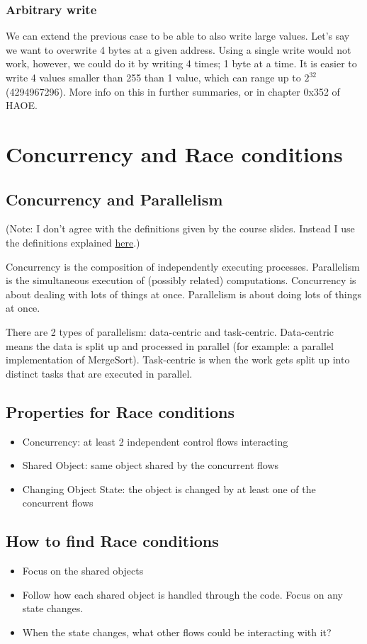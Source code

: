 \documentclass[letterpaper]{article}
\newcommand{\p}{\vspace{1em}\par}		%
\begin{document}
\subsubsection{Arbitrary write}
We can extend the previous case to be able to also write large values. Let's say we want to overwrite 4 bytes at a given address. Using a single write would not work, however, we could do it by writing 4 times; 1 byte at a time. It is easier to write 4 values smaller than 255 than 1 value, which can range up to $2^{32}$ (4294967296). More info on this in further summaries, or in chapter 0x352 of HAOE.

\section{Concurrency and Race conditions}
\subsection{Concurrency and Parallelism}
(Note: I don't agree with the definitions given by the course slides. Instead I use the definitions explained \href{http://blog.golang.org/concurrency-is-not-parallelism}{here}.)

\p Concurrency is the composition of independently executing processes. Parallelism is the simultaneous execution of (possibly related) computations. Concurrency is about dealing with lots of things at once. Parallelism is about doing lots of things at once.

\p There are 2 types of parallelism: data-centric and task-centric. Data-centric means the data is split up and processed in parallel (for example: a parallel implementation of MergeSort). Task-centric is when the work gets split up into distinct tasks that are executed in parallel.

\subsection{Properties for Race conditions}
\begin{itemize}
\item Concurrency: at least 2 independent control flows interacting
\item Shared Object: same object shared by the concurrent flows
\item Changing Object State: the object is changed by at least one of the concurrent flows
\end{itemize}

\subsection{How to find Race conditions}
\begin{itemize}
\item Focus on the shared objects
\item Follow how each shared object is handled through the code. Focus on any state changes.
\item When the state changes, what other flows could be interacting with it?
\end{itemize}
\end{document}

